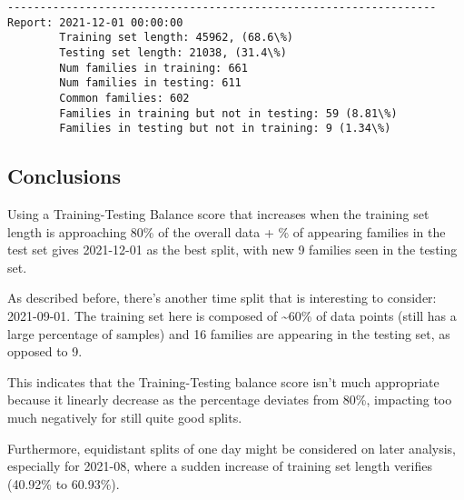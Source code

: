 \documentclass[11pt]{article}
\begin{document}
    \begin{Verbatim}[commandchars=\\\{\}]
------------------------------------------------------------------
Report: 2021-12-01 00:00:00
        Training set length: 45962, (68.6\%)
        Testing set length: 21038, (31.4\%)
        Num families in training: 661
        Num families in testing: 611
        Common families: 602
        Families in training but not in testing: 59 (8.81\%)
        Families in testing but not in training: 9 (1.34\%)
    \end{Verbatim}

    \hypertarget{conclusions}{%
\subsection{Conclusions}\label{conclusions}}

Using a Training-Testing Balance score that increases when the training
set length is approaching 80\% of the overall data + \% of appearing
families in the test set gives 2021-12-01 as the best split, with new 9
families seen in the testing set.

As described before, there's another time split that is interesting to
consider: 2021-09-01. The training set here is composed of
\textasciitilde60\% of data points (still has a large percentage of
samples) and 16 families are appearing in the testing set, as opposed to
9.

This indicates that the Training-Testing balance score isn't much
appropriate because it linearly decrease as the percentage deviates from
80\%, impacting too much negatively for still quite good splits.

Furthermore, equidistant splits of one day might be considered on later
analysis, especially for 2021-08, where a sudden increase of training
set length verifies (40.92\% to 60.93\%).


    
    
    
\end{document}
